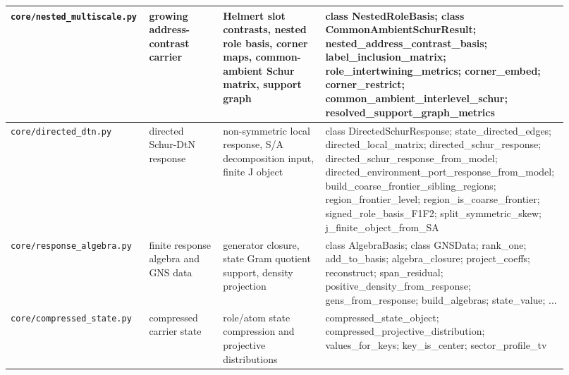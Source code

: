 \documentclass[11pt]{article}
\theoremstyle{remark}
\newcommand{\code}[1]{\texttt{#1}}
\numberwithin{equation}{section}
\begin{document}
\begin{longtable}{>{\raggedright\arraybackslash}p{0.22\linewidth}>{\raggedright\arraybackslash}p{0.13\linewidth}>{\raggedright\arraybackslash}p{0.18\linewidth}>{\raggedright\arraybackslash}p{0.39\linewidth}}
\hline
\code{core/nested\_\allowbreak{}multiscale.py} & growing address-contrast carrier & Helmert slot contrasts, nested role basis, corner maps, common-ambient Schur matrix, support graph & class NestedRoleBasis; class CommonAmbientSchurResult; nested\_\allowbreak{}address\_\allowbreak{}contrast\_\allowbreak{}basis; label\_\allowbreak{}inclusion\_\allowbreak{}matrix; role\_\allowbreak{}intertwining\_\allowbreak{}metrics; corner\_\allowbreak{}embed; corner\_\allowbreak{}restrict; common\_\allowbreak{}ambient\_\allowbreak{}interlevel\_\allowbreak{}schur; resolved\_\allowbreak{}support\_\allowbreak{}graph\_\allowbreak{}metrics\\
\hline
\code{core/directed\_\allowbreak{}dtn.py} & directed Schur-DtN response & non-symmetric local response, S/A decomposition input, finite J object & class DirectedSchurResponse; state\_\allowbreak{}directed\_\allowbreak{}edges; directed\_\allowbreak{}local\_\allowbreak{}matrix; directed\_\allowbreak{}schur\_\allowbreak{}response; directed\_\allowbreak{}schur\_\allowbreak{}response\_\allowbreak{}from\_\allowbreak{}model; directed\_\allowbreak{}environment\_\allowbreak{}port\_\allowbreak{}response\_\allowbreak{}from\_\allowbreak{}model; build\_\allowbreak{}coarse\_\allowbreak{}frontier\_\allowbreak{}sibling\_\allowbreak{}regions; region\_\allowbreak{}frontier\_\allowbreak{}level; region\_\allowbreak{}is\_\allowbreak{}coarse\_\allowbreak{}frontier; signed\_\allowbreak{}role\_\allowbreak{}basis\_\allowbreak{}F1F2; split\_\allowbreak{}symmetric\_\allowbreak{}skew; j\_\allowbreak{}finite\_\allowbreak{}object\_\allowbreak{}from\_\allowbreak{}SA\\
\hline
\code{core/response\_\allowbreak{}algebra.py} & finite response algebra and GNS data & generator closure, state Gram quotient support, density projection & class AlgebraBasis; class GNSData; rank\_\allowbreak{}one; add\_\allowbreak{}to\_\allowbreak{}basis; algebra\_\allowbreak{}closure; project\_\allowbreak{}coeffs; reconstruct; span\_\allowbreak{}residual; positive\_\allowbreak{}density\_\allowbreak{}from\_\allowbreak{}response; gens\_\allowbreak{}from\_\allowbreak{}response; build\_\allowbreak{}algebras; state\_\allowbreak{}value; ...\\
\hline
\code{core/compressed\_\allowbreak{}state.py} & compressed carrier state & role/atom state compression and projective distributions & compressed\_\allowbreak{}state\_\allowbreak{}object; compressed\_\allowbreak{}projective\_\allowbreak{}distribution; values\_\allowbreak{}for\_\allowbreak{}keys; key\_\allowbreak{}is\_\allowbreak{}center; sector\_\allowbreak{}profile\_\allowbreak{}tv\\

\end{longtable}
\end{document}
